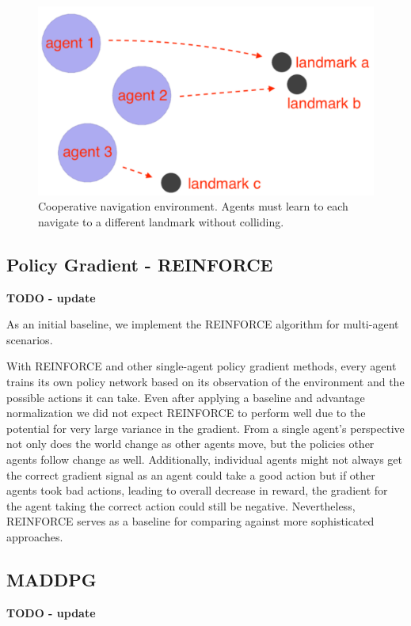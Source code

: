 \documentclass{article}
\begin{document}
\begin{figure}
\begin{center}
\includegraphics[scale=0.5]{env-image}
\end{center}
\caption{Cooperative navigation environment. Agents must learn to each navigate to a different landmark without colliding.}
\end{figure}

\subsection{Policy Gradient - REINFORCE}
\textbf{TODO - update}

As an initial baseline, we implement the REINFORCE algorithm for multi-agent scenarios. 

With REINFORCE and other single-agent policy gradient methods, every agent trains its own policy network based on its observation of the environment and the possible actions it can take. Even after applying a baseline and advantage normalization we did not expect REINFORCE to perform well due to the potential for very large variance in the gradient. From a single agent's perspective not only does the world change as other agents move, but the policies other agents follow change as well. Additionally, individual agents might not always get the correct gradient signal as an agent could take a good action but if other agents took bad actions, leading to overall decrease in reward, the gradient for the agent taking the correct action could still be negative. Nevertheless, REINFORCE serves as a baseline for comparing against more sophisticated approaches.

\subsection{MADDPG}
\textbf{TODO - update}
\end{document}
